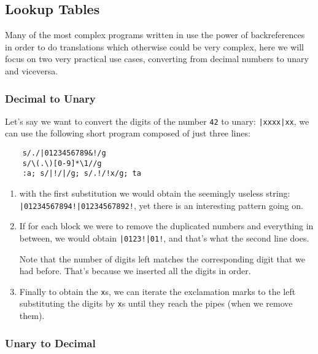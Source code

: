 

\subsection{Lookup Tables}

Many of the most complex programs written in \sed use the power of
backreferences in order to do translations which otherwise could be very
complex, here we will focus on two very practical use cases, converting from
decimal numbers to unary and viceversa.

\subsubsection{Decimal to Unary}

Let's say we want to convert the digits of the number {\tt 42} to unary:
{\tt |xxxx|xx}, we can use the following short program composed of just three
lines:

\begin{Verbatim}
	s/./|0123456789&!/g
	s/\(.\)[0-9]*\1//g
	:a; s/|!/|/g; s/.!/!x/g; ta
\end{Verbatim}

\begin{enumerate}
	\item with the first substitution we would obtain the seemingly useless
		string: {\tt |01234567894!|01234567892!}, yet there is an interesting
		pattern going on.
	\item If for each block we were to remove the duplicated numbers and
		everything in between, we would obtain {\tt |0123!|01!}, and that's
		what the second line does.

		Note that the number of digits left matches the corresponding digit
		that we had before.  That's because we inserted all the digits in order.

	\item Finally to obtain the {\tt x}s, we can iterate the exclamation marks
		to the left substituting the digits by {\tt x}s until they reach the
		pipes (when we remove them).
\end{enumerate}

\subsubsection{Unary to Decimal}

